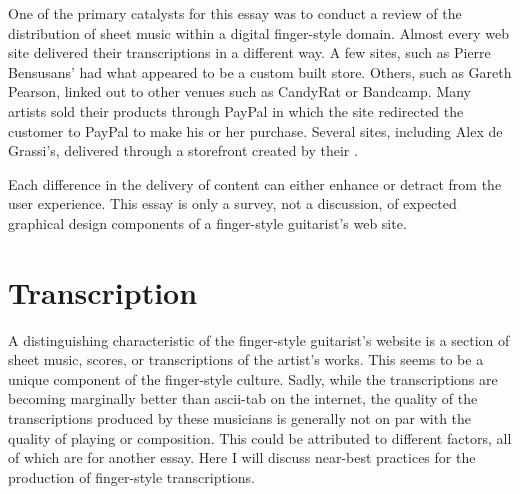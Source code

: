 \documentclass[unicode,hyperfootnotes=false,xetex,colorlinks=true,nofonts,nobib]{tufte-handout}
\newcommand{\textls}[2][5]{%
    \begingroup\addfontfeatures{LetterSpace=#1}#2\endgroup
  }
\renewcommand{\smallcapsspacing}[1]{\textls[10]{#1}}
\renewcommand{\textsc}[1]{\smallcapsspacing{\textsmallcaps{#1}}}
\begin{document}
One of the primary catalysts for this essay was to conduct a review of the distribution of sheet music within a digital finger-style domain. Almost every web site delivered their transcriptions in a different way. A few sites, such as Pierre Bensusans' had what appeared to be a custom built store. Others, such as Gareth Pearson, linked out to other venues such as CandyRat or Bandcamp. Many artists sold their products through PayPal in which the site redirected the customer to PayPal to make his or her purchase. Several sites, including Alex de Grassi's, delivered through a storefront created by their \textsc{cms}.

Each difference in the delivery of content can either enhance or detract from the user experience. This essay is only a survey, not a discussion, of expected graphical design components of a finger-style guitarist's web site.
\section{Transcription}
A distinguishing characteristic of the finger-style guitarist's website is a section of sheet music, scores, or transcriptions of the artist's works. This seems to be a unique component of the finger-style culture. Sadly, while the transcriptions are becoming marginally better than ascii-tab on the internet, the quality of the transcriptions produced by these musicians is generally not on par with the quality of playing or composition. This could be attributed to different factors, all of which are for another essay. Here I will discuss near-best practices for the production of finger-style transcriptions.
\end{document}
